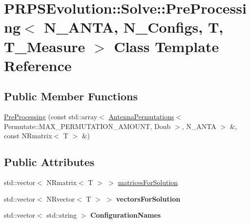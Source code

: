 \hypertarget{class_p_r_p_s_evolution_1_1_solve_1_1_pre_processing}{\section{P\-R\-P\-S\-Evolution\-:\-:Solve\-:\-:Pre\-Processing$<$ N\-\_\-\-A\-N\-T\-A, N\-\_\-\-Configs, T, T\-\_\-\-Measure $>$ Class Template Reference}
\label{class_p_r_p_s_evolution_1_1_solve_1_1_pre_processing}
}
\subsection*{Public Member Functions}
\begin{DoxyCompactItemize}
\item 
\hyperlink{class_p_r_p_s_evolution_1_1_solve_1_1_pre_processing_a693459b1a0d621ac4eac4005388b33e8}{Pre\-Processing} (const std\-::array$<$ \hyperlink{struct_p_r_p_s_evolution_1_1_permutate_1_1_antenna_permutations}{Antenna\-Permutations}$<$ Permutate\-::\-M\-A\-X\-\_\-\-P\-E\-R\-M\-U\-T\-A\-T\-I\-O\-N\-\_\-\-A\-M\-O\-U\-N\-T, Doub $>$, N\-\_\-\-A\-N\-T\-A $>$ \&, const N\-Rmatrix$<$ T $>$ \&)
\end{DoxyCompactItemize}
\subsection*{Public Attributes}
\begin{DoxyCompactItemize}
\item 
std\-::vector$<$ N\-Rmatrix$<$ T $>$ $>$ \hyperlink{class_p_r_p_s_evolution_1_1_solve_1_1_pre_processing_a4e9469f9c8f85349c269b90ff6d435be}{matrices\-For\-Solution}
\item 
\hypertarget{class_p_r_p_s_evolution_1_1_solve_1_1_pre_processing_a3490003ccdf990489f09fc995eb7b69e}{std\-::vector$<$ N\-Rvector$<$ T $>$ $>$ {\bfseries vectors\-For\-Solution}}\label{class_p_r_p_s_evolution_1_1_solve_1_1_pre_processing_a3490003ccdf990489f09fc995eb7b69e}

\item 
\hypertarget{class_p_r_p_s_evolution_1_1_solve_1_1_pre_processing_a5668b7f1d8e4cdb3c4772ea216cdcdc8}{std\-::vector$<$ std\-::string $>$ {\bfseries Configuration\-Names}}\label{class_p_r_p_s_evolution_1_1_solve_1_1_pre_processing_a5668b7f1d8e4cdb3c4772ea216cdcdc8}

\end{DoxyCompactItemize}


